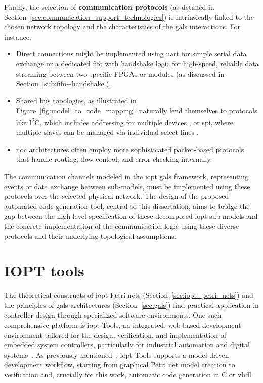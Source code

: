 Finally, the selection of \textbf{communication protocols} (as detailed in Section~\ref{sec:communication_support_technologies}) is intrinsically linked to the chosen network topology and the characteristics of the \gls{gals} interactions. For instance:

\begin{itemize}
    \item Direct connections might be implemented using \gls{uart} for simple serial data exchange \cite{UARTwiki, Rao2021} or a dedicated \gls{fifo} with handshake logic for high-speed, reliable data streaming between two specific FPGAs or modules (as discussed in Section~\ref{sub:fifo+handshake}).
    \item Shared bus topologies, as illustrated in Figure~\ref{fig:model_to_code_mapping}, naturally lend themselves to protocols like I\textsuperscript{2}C, which includes addressing for multiple devices \cite{i2c,I2Cv2}, or \gls{spi}, where multiple slaves can be managed via individual select lines \cite{spisite, spisite2}.
    \item \gls{noc} architectures often employ more sophisticated packet-based protocols that handle routing, flow control, and error checking internally.
\end{itemize}

The communication channels modeled in the \gls{iopt} \gls{gals} framework, representing events or data exchange between sub-models, must be implemented using these protocols over the selected physical network. The design of the proposed automated code generation tool, central to this dissertation, aims to bridge the gap between the high-level specification of these decomposed \gls{iopt} sub-models and the concrete implementation of the communication logic using these diverse protocols and their underlying topological assumptions.








\section{IOPT tools}
\label{sec:iopt_tools}



The theoretical constructs of \gls{iopt} Petri nets (Section~\ref{sec:iopt_petri_nets}) and the principles of \gls{gals} architectures (Section~\ref{sec:gals}) find practical application in controller design through specialized software environments. One such comprehensive platform is \gls{iopt}-Tools, an integrated, web-based development environment tailored for the design, verification, and implementation of embedded system controllers, particularly for industrial automation and digital systems~\cite{iopttools}. As previously mentioned~\cite{iopttools}, \gls{iopt}-Tools supports a model-driven development workflow, starting from graphical Petri net model creation to verification and, crucially for this work, automatic code generation in C or \gls{vhdl}.


